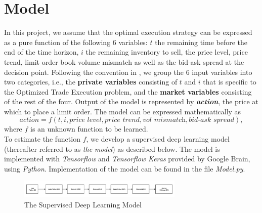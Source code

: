 \documentclass[12pt]{extarticle}
\begin{document}
\section{Model}
In this project, we assume that the optimal execution strategy can be expressed as
a pure function of the following 6 variables: $t$ the remaining time before the end of
the time horizon, $i$ the remaining inventory to sell, the price level, price trend,
limit order book volume mismatch as well as the bid-ask spread at the decision point.
Following the convention in \cite{reinforcement}, we group the 6 input variables
into two categories, i.e., the \textbf{private variables} consisting of $t$ and $i$
that is specific to the Optimized Trade Execution problem, and the \textbf{market variables}
consisting of the rest of the four. Output of the model is represented by \textit{\textbf{action}},
the price at which to place a limit order.
The model can be expressed mathematically as
$$ \textit{action} = f(t, i, \textit{price level}, \textit{price trend}, \textit{vol mismatch}, \textit{bid-ask spread}), $$
where $f$ is an unknown function to be learned. \\


\noindent To estimate the function $f$, we develop a supervised deep learning model (thereafter referred to as \textit{the model}) as described below.
The model is implemented with \textit{Tensorflow} and \textit{Tensorflow
Keras} provided by Google Brain, using \textit{Python}.
Implementation of the model can be found in the file \textit{Model.py}.
\begin{figure}[h]
\centering
\includegraphics[width=0.7\textwidth]{model}
\caption{The Supervised Deep Learning Model}
\end{figure}
\end{document}
